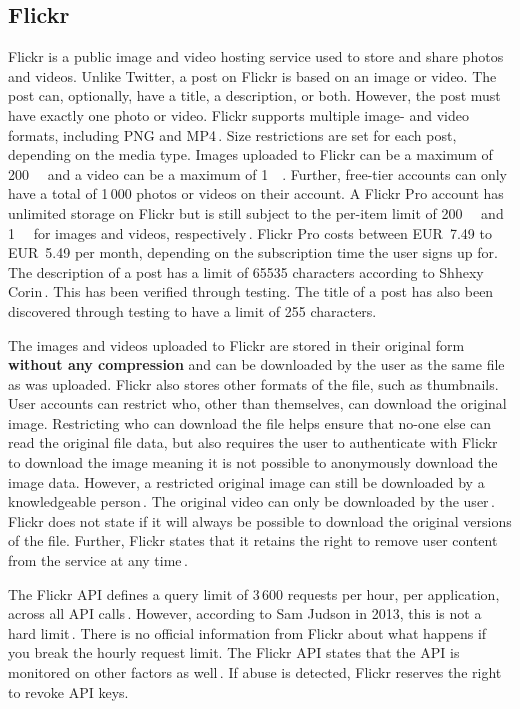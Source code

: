 \subsection{Flickr}
\label{subsec:ows_flickr}
Flickr is a public image and video hosting service used to store and share photos and videos. Unlike Twitter, a post on Flickr is based on an image or video. The post can, optionally, have a title, a description, or both. However, the post must have exactly one photo or video. Flickr supports multiple image- and video formats, including PNG and MP4\,\cite{FlickrUploadRequirements2022}. Size restrictions are set for each post, depending on the media type. Images uploaded to Flickr can be a maximum of \SI{200}{\mega\byte} and a video can be a maximum of \SI{1}{\giga\byte}. Further, \mbox{free-tier} accounts can only have a total of 1\,000 photos or videos on their account. A Flickr Pro account has unlimited storage on Flickr but is still subject to the \mbox{per-item} limit of \SI{200}{\mega\byte} and \SI{1}{\giga\byte} for images and videos, respectively\,\cite{flickrinc.UpgradeEverythingYou}. Flickr Pro costs between EUR~7.49 to EUR~5.49 per month, depending on the subscription time the user signs up for. The description of a post has a limit of 65535 characters according to Shhexy Corin\,\cite{FlickrHelpForum2009}. This has been verified through testing. The title of a post has also been discovered through testing to have a limit of 255 characters.

The images and videos uploaded to Flickr are stored in their original form \textbf{without any compression} and can be downloaded by the user as the same file as was uploaded\cite{flickrinc.DownloadPermissions}. Flickr also stores other formats of the file, such as thumbnails. User accounts can restrict who, other than themselves, can download the original image. Restricting who can download the file helps ensure that \mbox{no-one} else can read the original file data, but also requires the user to authenticate with Flickr to download the image meaning it is not possible to anonymously download the image data. However, a restricted original image can still be downloaded by a knowledgeable person\,\cite{FlickrHelpForum2020}. The original video can only be downloaded by the user\,\cite{flickrinc.DownloadPermissions}. Flickr does not state if it will always be possible to download the original versions of the file. Further, Flickr states that it retains the right to remove user content from the service at any time\,\cite{flickrinc.FlickrTermsConditions2020}.

The Flickr \gls{API} defines a query limit of 3\,600 requests per hour, per application, across all \gls{API} calls\,\cite{flickrinc.FlickrFlickrDeveloper}. However, according to Sam Judson in 2013, this is not a hard limit\,\cite{WhatAreAPI2013}. There is no official information from Flickr about what happens if you break the hourly request limit. The Flickr \gls{API} states that the \gls{API} is monitored on other factors as well\,\cite{flickrinc.FlickrFlickrDeveloper}. If abuse is detected, Flickr reserves the right to revoke \gls{API} keys.